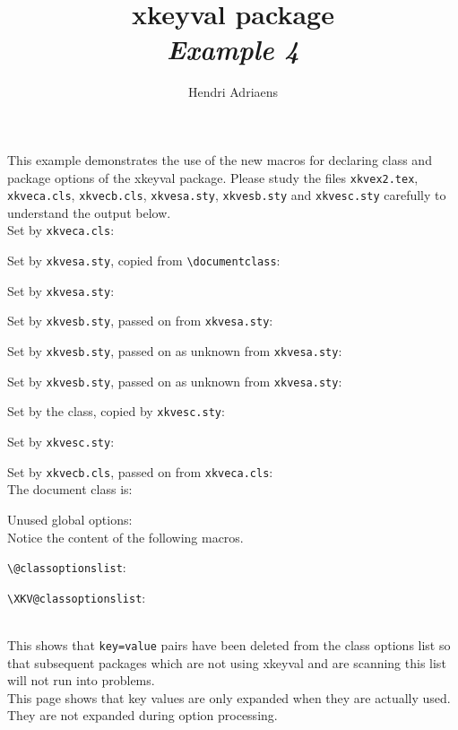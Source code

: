 \documentclass[keyi=test1 on page \thepage,keyvi,another=key,IgnoredGlobal,10pt]{xkveca}
\title{\textsf{xkeyval} package\\\normalsize\emph{Example 4}}
\author{Hendri Adriaens}
\makeatletter
\let\@tempa\@classoptionslist
\let\@tempb\@unusedoptionlist
\let\@tempc\XKV@classoptionslist
\makeatother
\begin{document}
\maketitle

This example demonstrates the use of the new macros for declaring
class and package options of the \textsf{xkeyval} package. Please
study the files \verb+xkvex2.tex+, \verb+xkveca.cls+,
\verb+xkvecb.cls+, \verb+xkvesa.sty+, \verb+xkvesb.sty+ and
\verb+xkvesc.sty+ carefully to understand the output below.\\

Set by \verb+xkveca.cls+: \keyi\par
Set by \verb+xkvesa.sty+, copied from \verb+\documentclass+: \keyia\par
Set by \verb+xkvesa.sty+: \keyii\par
Set by \verb+xkvesb.sty+, passed on from \verb+xkvesa.sty+: \keyiii\par
Set by \verb+xkvesb.sty+, passed on as unknown from \verb+xkvesa.sty+: \keyiv\par
Set by \verb+xkvesb.sty+, passed on as unknown from \verb+xkvesa.sty+: \keyv\par
Set by the class, copied by \verb+xkvesc.sty+: \keyvi\par
Set by \verb+xkvesc.sty+: \keyvii\par
Set by \verb+xkvecb.cls+, passed on from \verb+xkveca.cls+: \keyviii\\

The document class is: \XKV@documentclass\par
Unused global options: \texttt{\@tempb}\\

Notice the content of the following macros.\par
\verb+\@classoptionslist+: \texttt{\@tempa}\par
\verb+\XKV@classoptionslist+:\par\texttt{\@tempc}\\

This shows that \verb+key=value+ pairs have been deleted from the
class options list so that subsequent packages which are not using
\textsf{xkeyval} and are scanning this list will not run into
problems.\\

\newpage
This page shows that key values are only expanded when they are
actually used. They are not expanded during option processing.\\

\keyi\par
\keyii\par
\keyiv
\end{document}

